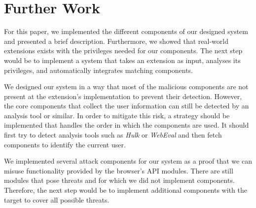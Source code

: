 
\chapter{Further Work}
\label{chp:furhterWork}

	For this paper, we implemented the different components of our designed system and presented a brief description. Furthermore, we showed that real-world extensions exists with the privileges needed for our components. The next step would be to implement a system that takes an extension as input, analyses its privileges, and automatically integrates matching components. 

	We designed our system in a way that most of the malicious components are not present at the extension's implementation to prevent their detection. However, the core components that collect the user information can still be detected by an analysis tool or similar. In order to mitigate this risk, a strategy should be implemented that handles the order in which the components are used. It should first try to detect analysis tools such as \textit{Hulk}\cite{184485} or \textit{WebEval}\cite{190984} and then fetch components to identify the current user.
	
	We implemented several attack components for our system as a proof that we can misuse functionality provided by the browser's API modules. There are still modules that pose threats and for which we did not implement components. Therefore, the next step would be to implement additional components with the target to cover all possible threats. 